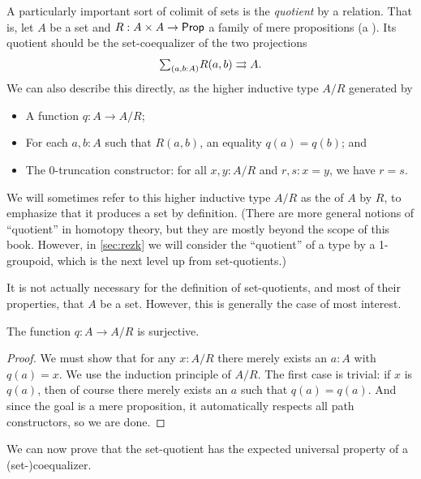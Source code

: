 A particularly important sort of colimit of sets is the \emph{quotient} by a relation.
That is, let $A$ be a set and $R:A\times A \to \mathsf{Prop}$ a family of mere propositions (a ).
%
%
Its quotient should be the set-coequalizer of the two projections
\[ \tsm{a,b:A} R(a,b) \rightrightarrows A. \]
We can also describe this directly, as the higher inductive type $A/R$ generated by
%
%
%
\begin{itemize}
\item A function $q:A\to A/R$;
\item For each $a,b:A$ such that $R(a,b)$, an equality $q(a)=q(b)$; and
\item The $0$-truncation constructor: for all $x,y:A/R$ and $r,s:x=y$, we have $r=s$.
\end{itemize}
We will sometimes refer to this higher inductive type $A/R$ as the  of $A$ by $R$, to emphasize that it produces a set by definition.
(There are more general notions of ``quotient'' in homotopy theory, but they are mostly beyond the scope of this book.
However, in \cref{sec:rezk} we will consider the ``quotient'' of a type by a 1-groupoid, which is the next level up from set-quotients.)

\begin{rmk}\label{rmk:quotient-of-non-set}
  It is not actually necessary for the definition of set-quotients, and most of their properties, that $A$ be a set.
  However, this is generally the case of most interest.
\end{rmk}

\begin{lem}\label{thm:quotient-surjective}
  The function $q:A\to A/R$ is surjective.
\end{lem}
\begin{proof}
  We must show that for any $x:A/R$ there merely exists an $a:A$ with $q(a)=x$.
  We use the induction principle of $A/R$.
  The first case is trivial: if $x$ is $q(a)$, then of course there merely exists an $a$ such that $q(a)=q(a)$.
  And since the goal is a mere proposition, it automatically respects all path constructors, so we are done.
\end{proof}

We can now prove that the set-quotient has the expected universal property of a (set-)coequalizer.

